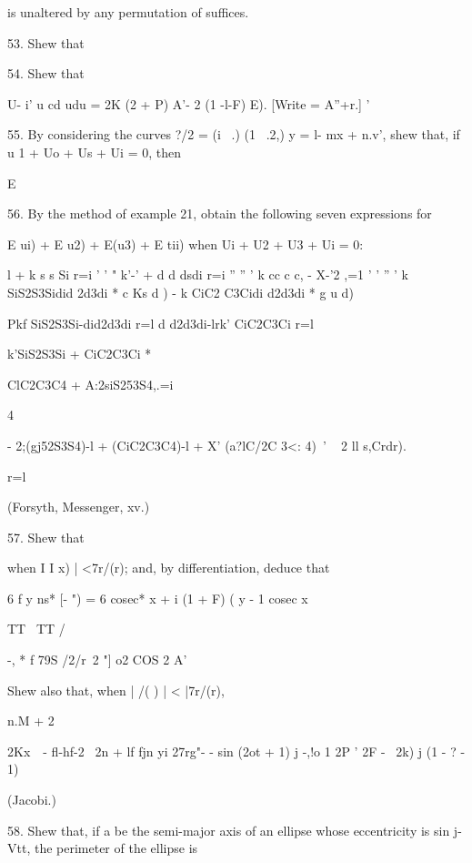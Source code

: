 is unaltered by any permutation of suffices. 

53. Shew that


54. Shew that

U- i' u cd udu = 2K (2 + P) A'- 2 (1 -l-F) E). [Write = A''+r.] '

55. By considering the curves ?/2 = (i \ .) (1 \ .2,) y = l- mx +
n.v', shew that, if u 1 + Uo + Us + Ui = 0, then

E %


56. By the method of example 21, obtain the following seven
expressions for

E ui) + E u2) + E(u3) + E tii) when Ui + U2 + U3 + Ui = 0:

l + k s s Si r=i ' ' " k'-' + d d dsdi r=i '' '' ' k cc c c, - X-'2
,=1 ' ' '' ' k SiS2S3Sidid 2d3di * c Ks d ) - k CiC2 C3Cidi d2d3di * g
u d)

Pkf SiS2S3Si-did2d3di r=l d d2d3di-lrk' CiC2C3Ci r=l

k'SiS2S3Si + CiC2C3Ci *

ClC2C3C4 + A:2siS253S4,.=i

4

- 2;(gj52S3S4)-l + (CiC2C3C4)-l + X' (a?lC/2C 3<: 4)~' ~ 2 ll s,Crdr).

r=l

(Forsyth, Messenger, xv.)

%
%

57. Shew that

when I I x) | <7r/(r); and, by differentiation, deduce that

6 f y ns* [- ") = 6 cosec* x + i (1 + F) ( y - 1 cosec x

TT \ TT /

 -, * f 79S /2/r\ 2 "] o2 COS 2 A'

Shew also that, when | /( ) | < |7r/(r),

n.M + 2

2Kx\ \ - fl-hf-2 \ 2n + lf fjn yi 27rg"- - sin (2ot + 1) j -,!o 1 2P
' 2F - \ 2k) j (1 - ? - 1) 

(Jacobi.)

58. Shew that, if a be the semi-major axis of an ellipse whose
eccentricity is sin j-Vtt, the perimeter of the ellipse is

